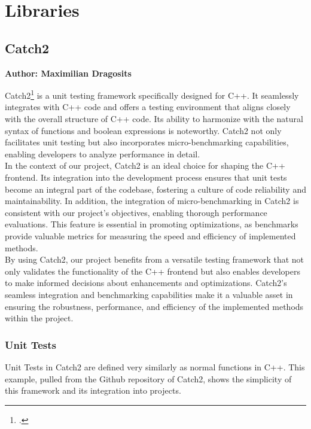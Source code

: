 \section{Libraries}

\subsection{Catch2}
\textbf{Author: Maximilian Dragosits}

Catch2\footcite{catch2_git} is a unit testing framework specifically designed for C++. It seamlessly integrates with C++ code and offers a testing environment 
that aligns closely with the overall structure of C++ code. Its ability to harmonize with the natural syntax of functions and boolean expressions is noteworthy. 
Catch2 not only facilitates unit testing but also incorporates micro-benchmarking capabilities, enabling developers to analyze performance in detail.\\

In the context of our project, Catch2 is an ideal choice for shaping the C++ frontend. Its integration into the development process ensures that unit tests 
become an integral part of the codebase, fostering a culture of code reliability and maintainability. In addition, the integration of micro-benchmarking in Catch2 
is consistent with our project's objectives, enabling thorough performance evaluations. This feature is essential in promoting optimizations, as benchmarks provide 
valuable metrics for measuring the speed and efficiency of implemented methods.\\

By using Catch2, our project benefits from a versatile testing framework that not only validates the functionality of the C++ frontend but also enables developers 
to make informed decisions about enhancements and optimizations. Catch2's seamless integration and benchmarking capabilities make it a valuable asset in ensuring 
the robustness, performance, and efficiency of the implemented methods within the project.

\subsubsection{Unit Tests}

Unit Tests in Catch2 are defined very similarly as normal functions in C++. This example, pulled from the Github repository of Catch2, shows the simplicity of
this framework and its integration into projects.

